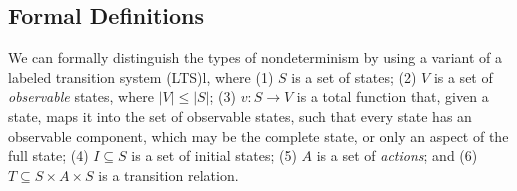 \subsection{Formal Definitions}
\label{sec:formal}

We can formally distinguish the types of nondeterminism by using a
variant of a labeled transition system (LTS)l, where (1) $S$
is a set of states; (2) $V$ is a set of \emph{observable} states, where
$|V| \leq |S|$; (3) $v: S \rightarrow V$ is a total function that, given a state, maps it
  into the set of observable states, such that every state has an observable
  component, which may be the complete state, or only an aspect of the
  full state; (4)  $I \subseteq S$ is a set of initial states; (5) $A$
  is a set of \emph{actions}; and (6) $T \subseteq S \times A \times S$ is a transition relation.

